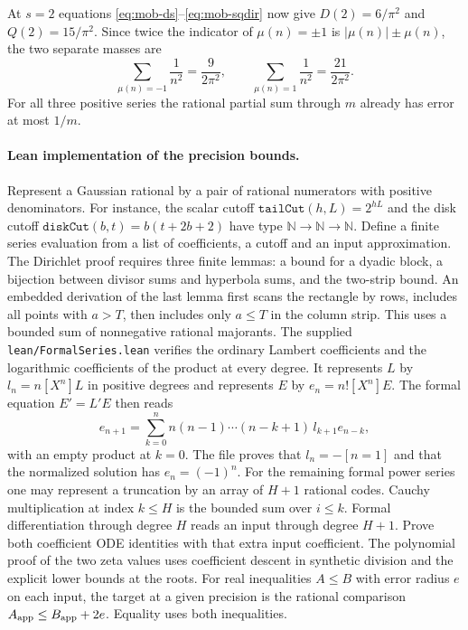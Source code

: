 At $s=2$ equations \eqref{eq:mob-ds}--\eqref{eq:mob-sqdir} now give
$D(2)=6/\pi^2$ and $Q(2)=15/\pi^2$. Since twice the indicator of
$\mu(n)=\pm1$ is $|\mu(n)|\pm\mu(n)$, the two separate masses are
\begin{equation}
 \sum_{\mu(n)=-1}\frac1{n^2}=\frac9{2\pi^2},\qquad
 \sum_{\mu(n)=1}\frac1{n^2}=\frac{21}{2\pi^2}.
\end{equation}
For all three positive series the rational partial sum through $m$
already has error at most $1/m$.

\paragraph{Lean implementation of the precision bounds.}
Represent a Gaussian rational by a pair of rational numerators with
positive denominators. For instance, the scalar cutoff
$\texttt{tailCut}(h,L)=2^{hL}$ and the disk cutoff
$\texttt{diskCut}(b,t)=b(t+2b+2)$ have type
$\mathbb N\to\mathbb N\to\mathbb N$. Define a finite series evaluation
from a list of coefficients, a cutoff and an input approximation.
The Dirichlet proof requires three finite lemmas: a bound for a dyadic
block, a bijection between divisor sums and hyperbola sums, and the
two-strip bound. An embedded derivation of the last lemma first scans the
rectangle by rows, includes all points with $a>T$, then includes only
$a\le T$ in the column strip. This uses a bounded sum of nonnegative
rational majorants. The supplied
\texttt{lean/FormalSeries.lean} verifies the ordinary Lambert coefficients
and the logarithmic coefficients of the product at every degree. It
represents $L$ by $l_n=n[X^n]L$ in positive degrees and represents $E$
by $e_n=n![X^n]E$. The formal equation $E'=L'E$ then reads
\[
 e_{n+1}=\sum_{k=0}^n n(n-1)\cdots(n-k+1)\,l_{k+1}e_{n-k},
\]
with an empty product at $k=0$. The file proves that $l_n=-[n=1]$
and that the normalized solution has $e_n=(-1)^n$.
For the remaining formal power series one may represent a
truncation by an array of $H+1$ rational codes. Cauchy multiplication
at index $k\le H$ is the bounded sum over $i\le k$. Formal differentiation
through degree $H$ reads an input through degree $H+1$.
Prove both coefficient ODE identities with that extra input coefficient.
The polynomial proof of the two zeta values uses coefficient descent in
synthetic division and the explicit lower bounds at the roots.
For real inequalities $A\le B$ with error radius $e$ on each input,
the target at a given precision is the rational comparison
$A_{\rm app}\le B_{\rm app}+2e$. Equality uses both inequalities.

